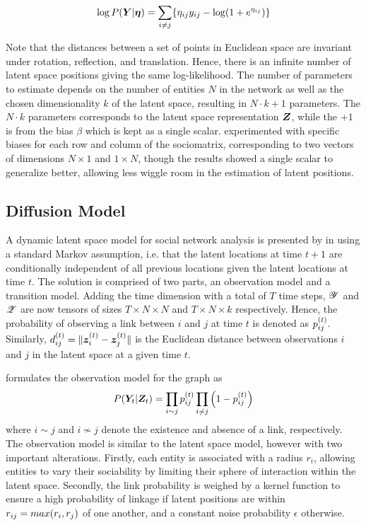     \begin{equation}\label{eq:lsm-likelihood}
        \log P(\Y|\bm{\eta}) = \sum_{i\neq j}\{ \sub(\eta)\sub(y) - \log(1+e^{\sub(\eta)}) \}
    \end{equation}
    
    Note that the distances between a set of points in Euclidean space are invariant under rotation, reflection, and translation. Hence, there is an infinite number of latent space positions giving the same log-likelihood. The number of parameters to estimate depends on the number of entities $N$ in the network as well as the chosen dimensionality $k$ of the latent space, resulting in $N \cdot k + 1$ parameters. The $N\cdot k$ parameters corresponds to the latent space representation $\bm{Z}$, while the $+1$ is from the bias $\beta$ which is kept as a single scalar. \citeauthor{jacobsen2018a} \cite{jacobsen2018a} experimented with specific biases for each row and column of the sociomatrix, corresponding to two vectors of dimensions $N\times 1$ and $1\times N$, though the results showed a single scalar to generalize better, allowing less wiggle room in the estimation of latent positions.
    
\subsection{Diffusion Model}
    
    A dynamic latent space model for social network analysis is presented by \citeauthor{sarkar2005dynamic} in \cite{sarkar2005dynamic} using a standard Markov assumption, i.e. that the latent locations at time $t+1$ are conditionally independent of all previous locations given the latent locations at time $t$. The solution is comprised of two parts, an observation model and a transition model. Adding the time dimension with a total of $T$ time steps, $\bm{\mathscr{Y}}$ and $\bm{\mathscr{Z}}$ are now tensors of sizes $T\times N\times N$ and $T\times N\times k$ respectively. Hence, the probability of observing a link between $i$ and $j$ at time $t$ is denoted as $\sub(p)^\t$. Similarly, $\sub(d)^\t = \Vert\z_i^\t-\z_j^\t\Vert$ is the Euclidean distance between observations $i$ and $j$ in the latent space at a given time $t$.%
    
    \citeauthor*{sarkar2005dynamic} formulates the observation model for the graph as
    \begin{equation}\label{eq:dsnl-observation}
        P(\Y_t|\Z_t) = \prod_{i\sim j} \sub(p)^\t \prod_{i\not\sim j} \left(1-\sub(p)^\t\right)
    \end{equation}
    where $i\sim j$ and $i\not\sim j$ denote the existence and absence of a link, respectively.
    The observation model is similar to the latent space model, however with two important alterations. Firstly, each entity is associated with a radius $r_i$, allowing entities to vary their sociability by limiting their sphere of interaction within the latent space.
    Secondly, the link probability is weighed by a kernel function to ensure a high probability of linkage if latent positions are within $\sub(r)=max(r_i,r_j)$ of one another, and a constant noise probability $\epsilon$ otherwise.
    

